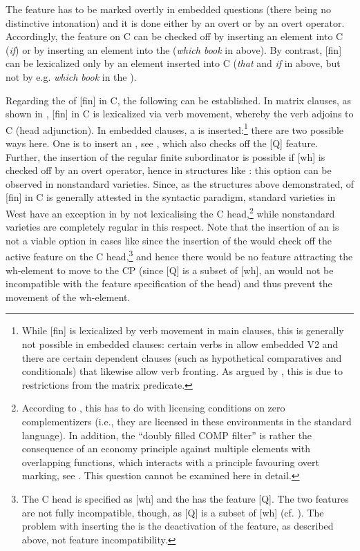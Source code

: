 \documentclass[output=paper,modfonts, hidelinks, newtxmath]{langscibook}
\begin{document}
\noindent The  feature has to be marked overtly in embedded questions (there being no distinctive  intonation) and it is done either by an overt  or by an overt operator. Accordingly, the  feature on C can be checked off by inserting an element into C (\textit{if}) or by inserting an element into the  (\textit{which book} in  above). By contrast, [fin] can be lexicalized only by an element inserted into C (\textit{that} and \textit{if} in  above, but not by e.g. \textit{which book} in the ).

Regarding the  of [fin] in C, the following can be established. In matrix clauses, as shown in , [fin] in C is lexicalized via verb movement, whereby the verb adjoins to C (head adjunction). In embedded clauses, a  is inserted:\footnote{While [fin] is lexicalized by verb movement in main clauses, this is generally not possible in embedded clauses: certain verbs in  allow embedded V2 and there are certain dependent clauses (such as hypothetical comparatives and conditionals) that likewise allow verb fronting. As argued by \citet{bacskaiatkaritoappear}, this is due to restrictions from the matrix predicate.} there are two possible ways here. One is to insert an  , see , which also checks off the [Q] feature. Further, the insertion of the regular finite subordinator is possible if [wh] is checked off by an overt operator, hence in structures like : this option can be observed in nonstandard varieties. Since, as the structures above demonstrated,  of [fin] in C is generally attested in the syntactic paradigm, standard varieties in West  have an exception in  by not lexicalising the C head,\footnote{According to \citet{bacskaiatkaritoappear}, this has to do with licensing conditions on zero complementizers (i.e., they are licensed in these environments in the standard language). In addition, the ``doubly filled COMP filter'' is rather the consequence of an economy principle against multiple elements with overlapping functions, which interacts with a principle favouring overt marking, see \citet{vangelderen2009}. This question cannot be examined here in detail.} while nonstandard varieties are completely regular in this respect. Note that the insertion of an   is not a viable option in cases like  since the insertion of the  would check off the active  feature on the C head,\footnote{The C head is specified as [wh] and the  has the feature [Q]. The two features are not fully incompatible, though, as [Q] is a subset of [wh] (cf. \citealt{bayer2004}). The problem with inserting the  is the deactivation of the feature, as described above, not feature incompatibility.} and hence there would be no feature attracting the wh-element to move to the CP (since [Q] is a subset of [wh], an   would not be incompatible with the feature specification of the head) and thus prevent the movement of the wh-element.
\end{document}
